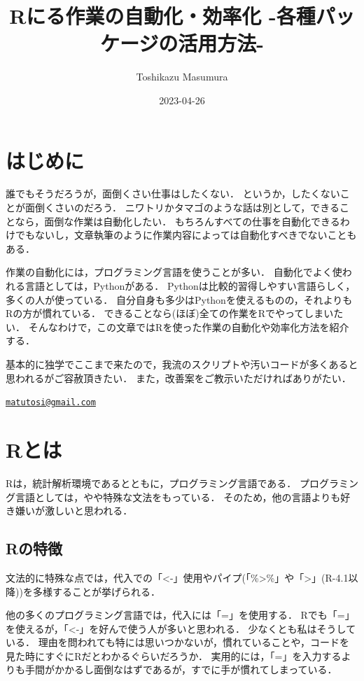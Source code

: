 \documentclass[
]{article}
\title{Rにる作業の自動化・効率化 -各種パッケージの活用方法-}
\author{Toshikazu Masumura}
\date{2023-04-26}
\begin{document}
\maketitle

{
\setcounter{tocdepth}{2}
\tableofcontents
}
\hypertarget{ux306fux3058ux3081ux306b}{%
\section*{はじめに}\label{ux306fux3058ux3081ux306b}}

誰でもそうだろうが，面倒くさい仕事はしたくない．
というか，したくないことが面倒くさいのだろう．
ニワトリかタマゴのような話は別として，できることなら，面倒な作業は自動化したい．
もちろんすべての仕事を自動化できるわけでもないし，文章執筆のように作業内容によっては自動化すべきでないこともある．

作業の自動化には，プログラミング言語を使うことが多い．
自動化でよく使われる言語としては，Pythonがある．
Pythonは比較的習得しやすい言語らしく，多くの人が使っている．
自分自身も多少はPythonを使えるものの，それよりもRの方が慣れている．
できることなら(ほぼ)全ての作業をRでやってしまいたい．
そんなわけで，この文章ではRを使った作業の自動化や効率化方法を紹介する．

基本的に独学でここまで来たので，我流のスクリプトや汚いコードが多くあると思われるがご容赦頂きたい．
また，改善案をご教示いただければありがたい．

\href{mailto:matutosi@gmail.com}{\nolinkurl{matutosi@gmail.com}}

\hypertarget{R}{%
\section{Rとは}\label{R}}

Rは，統計解析環境であるとともに，プログラミング言語である．
プログラミング言語としては，やや特殊な文法をもっている．
そのため，他の言語よりも好き嫌いが激しいと思われる．

\hypertarget{rux306eux7279ux5fb4}{%
\subsection{Rの特徴}\label{rux306eux7279ux5fb4}}

文法的に特殊な点では，代入での「\textless-」使用やパイプ(「\%\textgreater\%」や「\textbar\textgreater」(R-4.1以降))を多様することが挙げられる．

他の多くのプログラミング言語では，代入には「=」を使用する．
Rでも「=」を使えるが，「\textless-」を好んで使う人が多いと思われる．
少なくとも私はそうしている．
理由を問われても特には思いつかないが，慣れていることや，コードを見た時にすぐにRだとわかるぐらいだろうか．
実用的には，「=」を入力するよりも手間がかかるし面倒なはずであるが，すでに手が慣れてしまっている．
\end{document}
